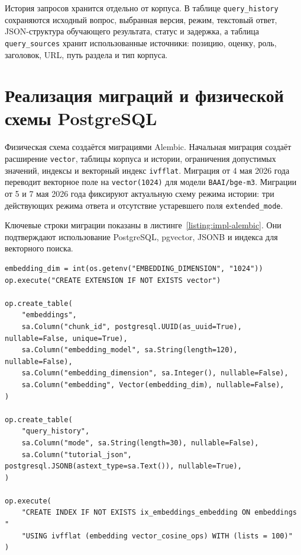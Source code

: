 История запросов хранится отдельно от корпуса. В таблице \texttt{query\_history} сохраняются исходный вопрос, выбранная версия, режим, текстовый ответ, JSON-структура обучающего результата, статус и задержка, а таблица \texttt{query\_sources} хранит использованные источники: позицию, оценку, роль, заголовок, URL, путь раздела и тип корпуса.

\section{Реализация миграций и физической схемы PostgreSQL}

Физическая схема создаётся миграциями Alembic. Начальная миграция создаёт расширение \texttt{vector}, таблицы корпуса и истории, ограничения допустимых значений, индексы и векторный индекс \texttt{ivfflat}. Миграция от 4 мая 2026 года переводит векторное поле на \texttt{vector(1024)} для модели \texttt{BAAI/bge-m3}. Миграции от 5 и 7 мая 2026 года фиксируют актуальную схему режима истории: три действующих режима ответа и отсутствие устаревшего поля \texttt{extended\_mode}.

Ключевые строки миграции показаны в листинге~\ref{listing:impl-alembic}. Они подтверждают использование PostgreSQL, pgvector, JSONB и индекса для векторного поиска.

\begin{listingblock}
\label{listing:impl-alembic}
\begin{verbatim}
embedding_dim = int(os.getenv("EMBEDDING_DIMENSION", "1024"))
op.execute("CREATE EXTENSION IF NOT EXISTS vector")

op.create_table(
    "embeddings",
    sa.Column("chunk_id", postgresql.UUID(as_uuid=True), nullable=False, unique=True),
    sa.Column("embedding_model", sa.String(length=120), nullable=False),
    sa.Column("embedding_dimension", sa.Integer(), nullable=False),
    sa.Column("embedding", Vector(embedding_dim), nullable=False),
)

op.create_table(
    "query_history",
    sa.Column("mode", sa.String(length=30), nullable=False),
    sa.Column("tutorial_json", postgresql.JSONB(astext_type=sa.Text()), nullable=True),
)

op.execute(
    "CREATE INDEX IF NOT EXISTS ix_embeddings_embedding ON embeddings "
    "USING ivfflat (embedding vector_cosine_ops) WITH (lists = 100)"
)
\end{verbatim}
\end{listingblock}

